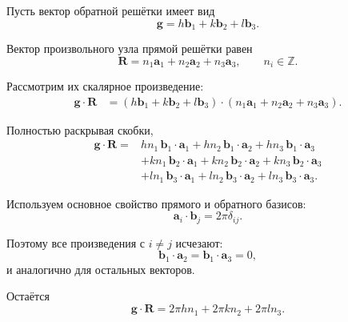 \documentclass[../final.tex]{subfiles}
\begin{document}
Пусть вектор обратной решётки имеет вид
%
\begin{equation*}
    \mathbf g
    =
    h\mathbf b_1
    +
    k\mathbf b_2
    +
    l\mathbf b_3.
\end{equation*}

Вектор произвольного узла прямой решётки равен
%
\begin{equation*}
    \mathbf R
    =
    n_1\mathbf a_1
    +
    n_2\mathbf a_2
    +
    n_3\mathbf a_3,
    \qquad
    n_i\in\mathbb Z.
\end{equation*}

Рассмотрим их скалярное произведение:
%
\begin{align*}
    \mathbf g\cdot\mathbf R
    &=
    \left(
        h\mathbf b_1
        +
        k\mathbf b_2
        +
        l\mathbf b_3
    \right)
    \cdot
    \left(
        n_1\mathbf a_1
        +
        n_2\mathbf a_2
        +
        n_3\mathbf a_3
    \right).
\end{align*}

Полностью раскрывая скобки,
%
\begin{align*}
    \mathbf g\cdot\mathbf R
    ={}&
    hn_1\,\mathbf b_1\cdot\mathbf a_1
    +
    hn_2\,\mathbf b_1\cdot\mathbf a_2
    +
    hn_3\,\mathbf b_1\cdot\mathbf a_3
    \\
    &+
    kn_1\,\mathbf b_2\cdot\mathbf a_1
    +
    kn_2\,\mathbf b_2\cdot\mathbf a_2
    +
    kn_3\,\mathbf b_2\cdot\mathbf a_3
    \\
    &+
    ln_1\,\mathbf b_3\cdot\mathbf a_1
    +
    ln_2\,\mathbf b_3\cdot\mathbf a_2
    +
    ln_3\,\mathbf b_3\cdot\mathbf a_3.
\end{align*}

Используем основное свойство прямого и обратного базисов:
%
\begin{equation*}
    \mathbf a_i\cdot\mathbf b_j
    =
    2\pi\delta_{ij}.
\end{equation*}

Поэтому все произведения с $i\neq j$ исчезают:
%
\begin{equation*}
    \mathbf b_1\cdot\mathbf a_2
    =
    \mathbf b_1\cdot\mathbf a_3
    =
    0,
\end{equation*}
%
и аналогично для остальных векторов.

Остаётся
%
\begin{equation*}
    \mathbf g\cdot\mathbf R
    =
    2\pi hn_1
    +
    2\pi kn_2
    +
    2\pi ln_3.
\end{equation*}
\end{document}
